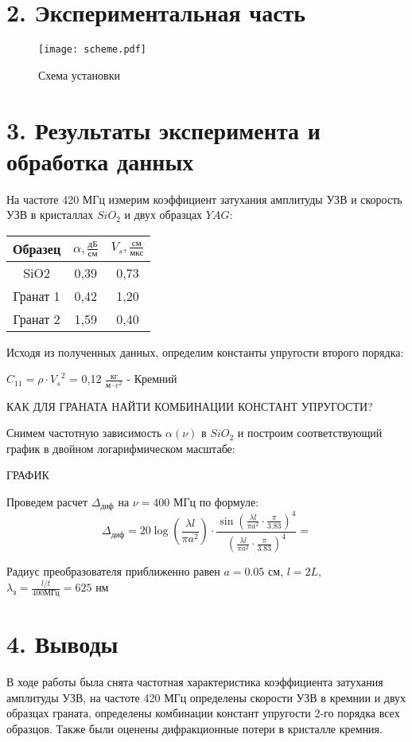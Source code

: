 \documentclass[a4paper,12pt]{report}
\begin{document}
    \section*{2. Экспериментальная часть}
\begin{figure}[H]
	\centering
	\texttt{[image: scheme.pdf]}
	\caption{Схема установки}
\end{figure}
    
\section*{3. Результаты эксперимента и обработка данных}
На частоте 420 МГц измерим коэффициент затухания амплитуды УЗВ и скорость УЗВ в кристаллах $SiO_{2}$ и двух образцах $YAG$:
\begin{table}[H]
\begin{tabular}{|c|c|c|}
\hline
Образец  & $\alpha, \frac{\text{дБ}}{\text{см}}$ & $V_s, \frac{\text{см}}{\text{мкс}}$ \\ \hline
SiO2     & 0,39         & 0,73         \\ \hline
Гранат 1 & 0,42         & 1,20         \\ \hline
Гранат 2 & 1,59         & 0,40         \\ \hline
\end{tabular}
\end{table}

Исходя из полученных данных, определим константы упругости второго порядка:
\begin{center}
    $C_{11} = \rho \cdot {V_s}^2$ = 0,12 $\frac{\text{кг}}{\text{м}\cdot c^2}$ - Кремний

    КАК ДЛЯ ГРАНАТА НАЙТИ КОМБИНАЦИИ КОНСТАНТ УПРУГОСТИ?
\end{center}


Снимем частотную зависимость $\alpha(\nu)$ в $SiO_2$ и построим соответствующий график в двойном логарифмическом масштабе:

ГРАФИК

Проведем расчет $\Delta_{\text{диф}}$ на $\nu=400$ МГц по формуле:
\begin{equation}
    \Delta_{\text{диф}}=20 \log(\frac{\lambda l}{\pi a^2})\cdot\frac{\sin(\frac{\lambda l}{\pi a^2}\cdot\frac{\pi}{3.83})^4}{(\frac{\lambda l}{\pi a^2}\cdot\frac{\pi}{3.83})^4} = 
\end{equation}

Радиус преобразователя приближенно равен $a=0.05$ см, $l=2 L$, $\lambda_{\text{з}}=\frac{l/t}{400\text{МГц}}=625$ нм


\section*{4. Выводы}
В ходе работы была снята частотная характеристика коэффициента затухания амплитуды УЗВ, на частоте 420 МГц определены скорости УЗВ в кремнии и двух образцах граната, определены комбинации констант упругости 2-го порядка всех образцов. Также были оценены дифракционные потери в кристалле кремния.
\end{document}
